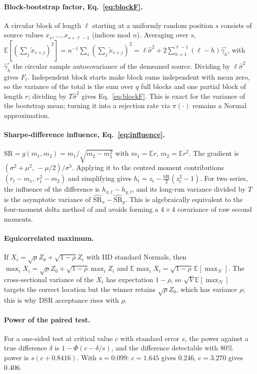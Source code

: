 \documentclass[11pt,a4paper]{article}
\newcommand{\SR}{\mathrm{SR}}
\newcommand{\hSR}{\widehat{\mathrm{SR}}}
\newcommand{\E}{\mathbb{E}}
\theoremstyle{remark}
\begin{document}
\paragraph{Block-bootstrap factor, Eq.~\eqref{eq:blockF}.} A circular block of length $\ell$ starting at a uniformly random position $s$ consists of source values $x_{s},\dots,x_{s+\ell-1}$ (indices mod $n$). Averaging over $s$, $\E[(\sum_{j}\tilde x_{s+j})^2]=n^{-1}\sum_s(\sum_j\tilde x_{s+j})^2=\ell\hat\sigma^2+2\sum_{h=1}^{\ell-1}(\ell-h)\hat\gamma^{\circ}_h$, with $\hat\gamma^\circ_h$ the circular sample autocovariance of the demeaned source. Dividing by $\ell\hat\sigma^2$ gives $F_\ell$. Independent block starts make block sums independent with mean zero, so the variance of the total is the sum over $q$ full blocks and one partial block of length $r$; dividing by $T\hat\sigma^2$ gives Eq.~\eqref{eq:blockF}. This is exact for the variance of the bootstrap mean; turning it into a rejection rate via $\pi(\cdot)$ remains a Normal approximation.

\paragraph{Sharpe-difference influence, Eq.~\eqref{eq:influence}.} $\SR=g(m_1,m_2)=m_1/\sqrt{m_2-m_1^2}$ with $m_1=\E r$, $m_2=\E r^2$. The gradient is $(\sigma^2+\mu^2,\,-\mu/2)/\sigma^3$. Applying it to the centred moment contributions $(r_t-m_1,\,r_t^2-m_2)$ and simplifying gives $h_t=z_t-\tfrac{\SR}{2}(z_t^2-1)$. For two series, the influence of the difference is $h_{x,t}-h_{y,t}$, and its long-run variance divided by $T$ is the asymptotic variance of $\hSR_x-\hSR_y$. This is algebraically equivalent to the four-moment delta method of \citet[Eqs.~1--5]{ledoit2008} and avoids forming a $4\times4$ covariance of raw second moments.

\paragraph{Equicorrelated maximum.} If $X_i=\sqrt\rho Z_0+\sqrt{1-\rho}Z_i$ with IID standard Normals, then $\max_iX_i=\sqrt\rho Z_0+\sqrt{1-\rho}\max_iZ_i$ and $\E\max_iX_i=\sqrt{1-\rho}\,\E[\max_N]$. The cross-sectional variance of the $X_i$ has expectation $1-\rho$, so $\sqrt{V}\E[\max_N]$ targets the correct location but the winner retains $\sqrt\rho Z_0$, which has variance $\rho$; this is why DSR acceptance rises with $\rho$.

\paragraph{Power of the paired test.} For a one-sided test at critical value $c$ with standard error $s$, the power against a true difference $\delta$ is $1-\Phi(c-\delta/s)$, and the difference detectable with 80\% power is $s(c+0.8416)$. With $s=0.099$: $c=1.645$ gives 0.246, $c=3.270$ gives 0.406.
\end{document}

